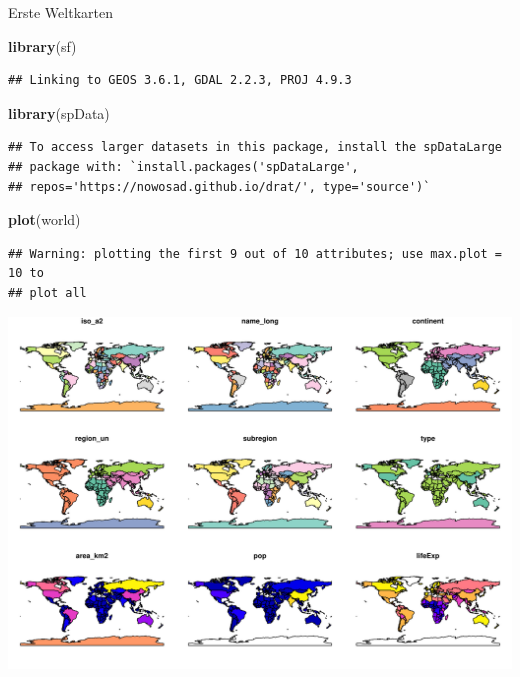 \documentclass[ignorenonframetext,]{beamer}
\newenvironment{Shaded}{\begin{snugshade}}{\end{snugshade}}
\newcommand{\KeywordTok}[1]{\textcolor[rgb]{0.13,0.29,0.53}{\textbf{#1}}}
\newcommand{\NormalTok}[1]{#1}
\begin{document}
\begin{frame}[fragile]{Erste Weltkarten}

\begin{Shaded}
\begin{Highlighting}[]
\KeywordTok{library}\NormalTok{(sf)}
\end{Highlighting}
\end{Shaded}

\begin{verbatim}
## Linking to GEOS 3.6.1, GDAL 2.2.3, PROJ 4.9.3
\end{verbatim}

\begin{Shaded}
\begin{Highlighting}[]
\KeywordTok{library}\NormalTok{(spData) }
\end{Highlighting}
\end{Shaded}

\begin{verbatim}
## To access larger datasets in this package, install the spDataLarge
## package with: `install.packages('spDataLarge',
## repos='https://nowosad.github.io/drat/', type='source')`
\end{verbatim}

\begin{Shaded}
\begin{Highlighting}[]
\KeywordTok{plot}\NormalTok{(world)}
\end{Highlighting}
\end{Shaded}

\begin{verbatim}
## Warning: plotting the first 9 out of 10 attributes; use max.plot = 10 to
## plot all
\end{verbatim}

\includegraphics{A1_HalloWelt_files/figure-beamer/unnamed-chunk-19-1.pdf}

\end{frame}
\end{document}
